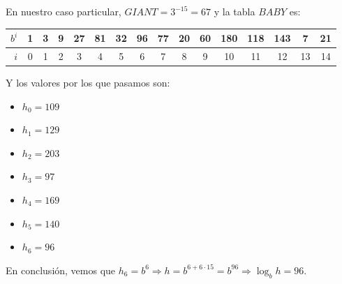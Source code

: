 	En nuestro caso particular, $GIANT = 3^{-15} = 67$ y la tabla $BABY$ es:
	\begin{center}
	\begin{tabular}{ | r | c  c  c  c  c  c  c  c  c  c  c  c  c  c  c |}
		\hline
		$b^i$   &  1  &  3  &  9  &  27 &  81 &  32 &  96 &  77 &  20 &  60 & 180 & 118 & 143 &  7  &  21 \\
		\hline
		$i$     &  0  &  1  &  2  &  3  &  4  &  5  &  6  &  7  &  8  &  9  &  10 &  11 &  12 &  13 &  14 \\
		\hline
	\end{tabular}
	\end{center}
	
	Y los valores por los que pasamos son:
	\begin{itemize}
		\item $h_0 = 109$
		\item $h_1 = 129$
		\item $h_2 = 203$
		\item $h_3 = 97$
		\item $h_4 = 169$
		\item $h_5 = 140$
		\item $h_6 = 96$
	\end{itemize}
	
	En conclusión, vemos que $h_6 = b^6 \Rightarrow h = b^{6 + 6 \cdot 15} = b^{96} \Rightarrow \log_b h = 96$.